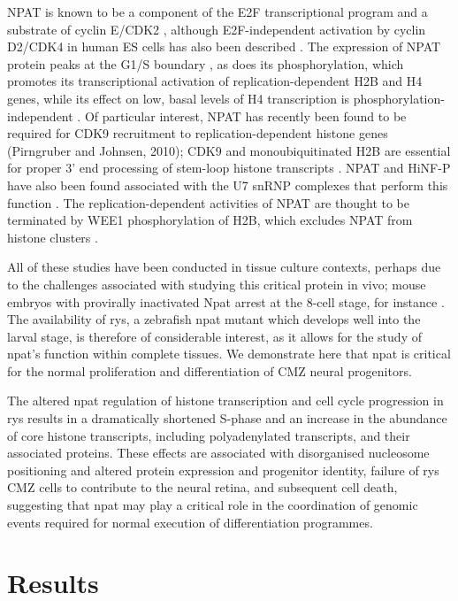 NPAT is known to be a component of the E2F transcriptional program \cite{Gao2003} and a substrate of cyclin E/CDK2 \cite{Zhao1998}, although E2F-independent activation by cyclin D2/CDK4 in human ES cells has also been described \cite{Becker2010}. The expression of NPAT protein peaks at the G1/S boundary \cite{Zhao1998}, as does its phosphorylation, which promotes its transcriptional activation of replication-dependent H2B \cite{Ma2000} and H4 \cite{Mitra2009} genes, while its effect on low, basal levels of H4 transcription is phosphorylation-independent \cite{Ye2003}. Of particular interest, NPAT has recently been found to be required for CDK9 recruitment to replication-dependent histone genes (Pirngruber and Johnsen, 2010); CDK9 and monoubiquitinated H2B are essential for proper 3’ end processing of stem-loop histone transcripts \cite{Pirngruber2009}. NPAT and HiNF-P have also been found associated with the U7 snRNP complexes that perform this function \cite{Ghule2009}. The replication-dependent activities of NPAT are thought to be terminated by WEE1 phosphorylation of H2B, which excludes NPAT from histone clusters \cite{Mahajan2012}.

All of these studies have been conducted in tissue culture contexts, perhaps due to the challenges associated with studying this critical protein in vivo; mouse embryos with provirally inactivated Npat arrest at the 8-cell stage, for instance \cite{DiFruscio1997}. The availability of rys, a zebrafish npat mutant which develops well into the larval stage, is therefore of considerable interest, as it allows for the study of npat’s function within complete tissues. We demonstrate here that npat is critical for the normal proliferation and differentiation of CMZ neural progenitors.

The altered npat regulation of histone transcription and cell cycle progression in rys results in a dramatically shortened S-phase and an increase in the abundance of core histone transcripts, including polyadenylated transcripts, and their associated proteins. These effects are associated with disorganised nucleosome positioning and altered protein expression and progenitor identity, failure of rys CMZ cells to contribute to the neural retina, and subsequent cell death, suggesting that npat may play a critical role in the coordination of genomic events required for normal execution of differentiation programmes.

\section{Results}
